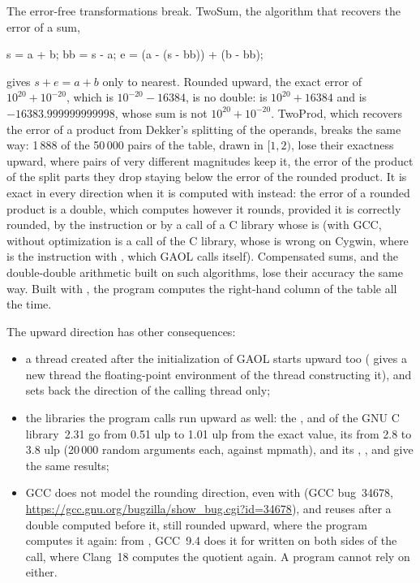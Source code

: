 \documentclass[12pt,a4paper,twoside,openright]{book}
\begin{document}
\medskip
The error-free transformations break. TwoSum, the algorithm that recovers the
error of a sum,

\begin{example}
s = a + b;  bb = s - a;  e = (a - (s - bb)) + (b - bb);
\end{example}

\noindent
gives $s+e=a+b$ only to nearest. Rounded upward, the exact error of
$10^{20}+10^{-20}$, which is $10^{-20}-16384$, is no double:  is
$10^{20}+16384$ and  is $-16383.999999999998$, whose sum is not
$10^{20}+10^{-20}$. TwoProd, which recovers the error of a product from
Dekker's splitting of the operands, breaks the same way: 1\,888 of the
50\,000 pairs of the table, drawn in $[1,2)$, lose their exactness upward,
where pairs of very different magnitudes keep it, the error of the product of
the split parts they drop staying below the error of the rounded product. It
is exact in every direction when it is computed with  instead:
the error of a rounded product is a double, which  computes
however it rounds, provided it is correctly rounded, by the instruction or by
a call of a C library whose  is (with GCC,  without
optimization is a call of the C library, whose  is wrong on
Cygwin, where  is the instruction with
, which GAOL calls itself). Compensated sums, and the
double-double arithmetic built on such algorithms, lose their accuracy the
same way. Built with , the program computes
the right-hand column of the table all the time.

\medskip
\noindent
The upward direction has other consequences:
\begin{itemize}
\item a thread created after the initialization of GAOL starts upward too
  ( gives a new thread the floating-point environment of the
  thread constructing it), and  sets back the direction of the
  calling thread only;
\item the libraries the program calls run upward as well: the ,
   and  of the GNU C library~2.31 go from 0.51 ulp to 1.01
  ulp from the exact value, its  from 2.8 to 3.8 ulp (20\,000
  random arguments each, against mpmath), and its , ,
   and  give the same results;
\item GCC does not model the rounding direction, even with
   (GCC bug~34678,
  \url{https://gcc.gnu.org/bugzilla/show_bug.cgi?id=34678}), and reuses after
   a double computed before it, still rounded upward, where
  the program computes it again: from , GCC~9.4 does it for
   written on both sides of the call, where Clang~18 computes the
  quotient again. A program cannot rely on either.
\end{itemize}
\end{document}
